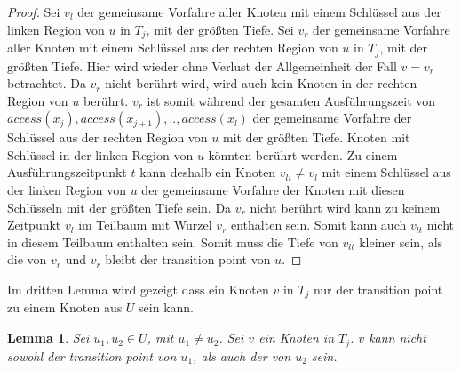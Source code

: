 \documentclass[a4paper,12pt]{article}
\begin{document}
\begin{proof}
 Sei $v_l$ der gemeinsame Vorfahre aller Knoten mit einem Schlüssel aus der linken Region von $u$ in $T_j$, mit der größten Tiefe. Sei $v_r$ der gemeinsame Vorfahre aller Knoten mit einem Schlüssel aus der rechten Region von $u$ in $T_j$, mit der größten Tiefe. Hier wird wieder ohne Verlust der Allgemeinheit der Fall $v = v_r$ betrachtet. Da $v_r$ nicht berührt wird, wird auch kein Knoten in der rechten Region von $u$ berührt. $v_r$ ist somit während der gesamten Ausführungszeit von $\textit{access}\left(x_j\right),\textit{access}\left(x_{j+1}\right),..,\textit{access}\left(x_l\right)$  der gemeinsame Vorfahre der Schlüssel aus der rechten Region von $u$ mit der größten Tiefe. Knoten mit Schlüssel in der linken Region von $u$ könnten berührt werden. Zu einem Ausführungszeitpunkt $t$ kann deshalb ein Knoten $v_{li} \ne v_l$ mit einem Schlüssel aus der linken Region von $u$ der gemeinsame Vorfahre der Knoten mit diesen Schlüsseln mit der größten Tiefe sein. Da $v_r$ nicht berührt wird kann zu keinem Zeitpunkt $v_l$ im Teilbaum mit Wurzel $v_r$ enthalten sein. Somit kann auch $v_{lt}$ nicht in diesem Teilbaum enthalten sein. Somit muss die Tiefe von  $v_{lt}$ kleiner sein, als die von $v_r$ und $v_r$ bleibt der transition point von $u$. 
\end{proof}

\noindent Im dritten Lemma wird gezeigt dass ein Knoten $v$ in $T_j$ nur der transition point zu einem Knoten aus $U$ sein kann.

\newtheorem{Lemma3}{Lemma}[section] \label{lemmaDemaine3}
\begin{Lemma3}
	Sei $u_1, u_2 \in U$, mit $u_1 \ne u_2$.  Sei $v$ ein Knoten in $T_j$. $v$ kann nicht sowohl der transition point von $u_1$, als auch der von $u_2$ sein.
\end{Lemma3}
\end{document}
